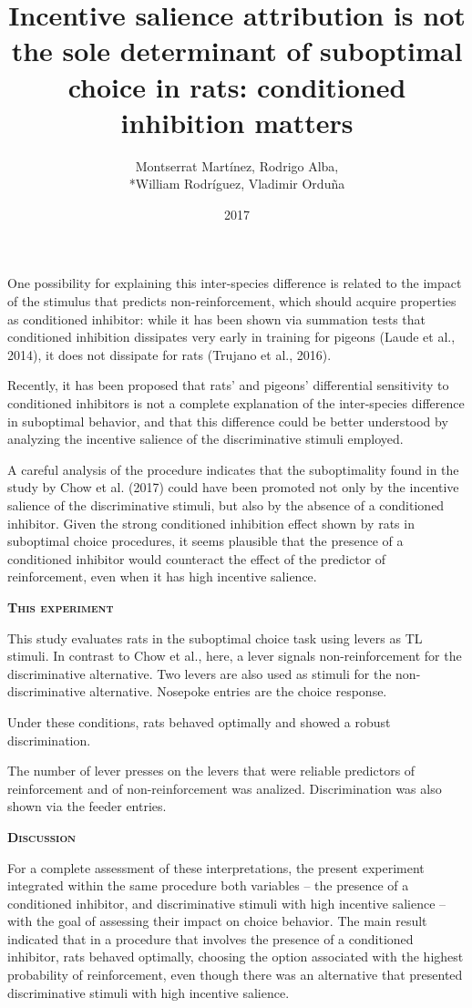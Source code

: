 \documentclass[a4paper,12pt]{article}
\title{Incentive salience attribution is not the sole determinant of suboptimal choice in rats: conditioned inhibition matters}
\author{Montserrat Martínez, Rodrigo Alba,\\*William Rodríguez, Vladimir Orduña}
\date{2017}
\begin{document}
{\scshape\bfseries \maketitle}

One possibility for explaining this inter-species difference is related to the impact of the stimulus that predicts non-reinforcement, which should acquire properties as conditioned inhibitor: while it has been shown via summation tests that conditioned inhibition dissipates very early in training for pigeons (Laude et al., 2014), it does not dissipate for rats (Trujano et al., 2016).

Recently, it has been proposed that rats’ and pigeons’ differential sensitivity to conditioned inhibitors is not a complete explanation of the inter-species difference in suboptimal behavior, and that this difference could be better understood by analyzing the incentive salience of the discriminative stimuli employed.

A careful analysis of the procedure indicates that the suboptimality found in the study by Chow et al. (2017) could have been promoted not only by the incentive salience of the discriminative stimuli, but also by the absence of a conditioned inhibitor. Given the strong conditioned inhibition effect shown by rats in suboptimal choice procedures, it seems plausible that the presence of a conditioned inhibitor would counteract the effect of the predictor of reinforcement, even when it has high incentive salience.

{\scshape\bfseries This experiment}

This study evaluates rats in the suboptimal choice task using levers as TL stimuli. In contrast to Chow et al., here, a lever signals non-reinforcement for the discriminative alternative. Two levers are also used as stimuli for the non-discriminative alternative. Nosepoke entries are the choice response. 

Under these conditions, rats behaved optimally and showed a robust discrimination.

The number of lever presses on the levers that were reliable predictors of reinforcement and of non-reinforcement was analized. Discrimination was also shown via the feeder entries.

{\scshape\bfseries Discussion}

For a complete assessment of these interpretations, the present experiment integrated within the same procedure both variables – the presence of a conditioned inhibitor, and discriminative stimuli with high incentive salience – with the goal of assessing their impact on choice behavior. The main result indicated that in a procedure that involves the presence of a conditioned inhibitor, rats behaved optimally, choosing the option associated with the highest probability of reinforcement, even though there was an alternative that presented discriminative stimuli with high incentive salience.
\end{document}
